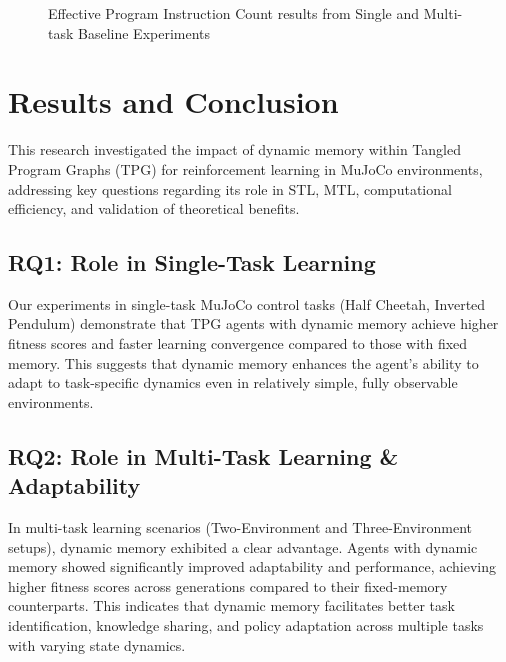 \documentclass[sigconf]{acmart}
\begin{document}
{\begin{figure}[t]
    
    \caption{Effective Program Instruction Count results from Single and Multi-task Baseline Experiments}\label{fig:effective_program}
  \end{figure}

  \clearpage
}

\section{Results and Conclusion}

This research investigated the impact of dynamic memory within Tangled Program Graphs (TPG) for 
reinforcement learning in MuJoCo environments, addressing key questions regarding its role in 
STL, MTL, computational efficiency, and validation of theoretical benefits.

\subsection{RQ1: Role in Single-Task Learning} 
Our experiments in single-task MuJoCo control tasks (Half Cheetah, Inverted Pendulum) demonstrate 
that TPG agents with dynamic memory achieve higher fitness scores and faster learning convergence 
compared to those with fixed memory. This suggests that dynamic memory enhances the agent's ability 
to adapt to task-specific dynamics even in relatively simple, fully observable environments.

\subsection{RQ2: Role in Multi-Task Learning \& Adaptability} 
In multi-task learning scenarios (Two-Environment and Three-Environment setups), dynamic memory exhibited a clear advantage. 
Agents with dynamic memory showed significantly improved adaptability and performance, achieving 
higher fitness scores across generations compared to their fixed-memory counterparts. This indicates 
that dynamic memory facilitates better task identification, knowledge sharing, and policy adaptation 
across multiple tasks with varying state dynamics.
\end{document}
